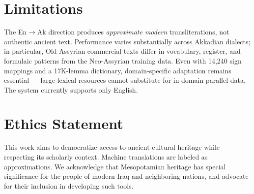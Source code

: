 \documentclass[11pt]{article}
\begin{document}
\section*{Limitations}

The En$\rightarrow$Ak direction produces \textit{approximate modern} transliterations, not authentic ancient text.
Performance varies substantially across Akkadian dialects; in particular, Old Assyrian commercial texts differ in vocabulary, register, and formulaic patterns from the Neo-Assyrian training data.
Even with 14,240 sign mappings and a 17K-lemma dictionary, domain-specific adaptation remains essential --- large lexical resources cannot substitute for in-domain parallel data.
The system currently supports only English.

\section*{Ethics Statement}

This work aims to democratize access to ancient cultural heritage while respecting its scholarly context.
Machine translations are labeled as approximations.
We acknowledge that Mesopotamian heritage has special significance for the people of modern Iraq and neighboring nations, and advocate for their inclusion in developing such tools.



\end{document}
